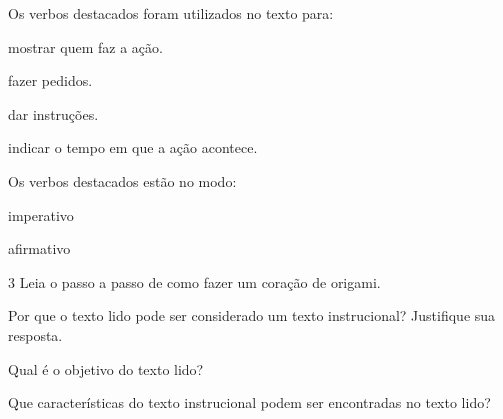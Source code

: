 \begin{escolha}
\item
  Os verbos destacados foram utilizados no texto para:

\begin{boxlist}
\boxitem[] mostrar quem faz a ação.

\boxitem[\rosa{X}] fazer pedidos.

\boxitem[] dar instruções.

\boxitem[] indicar o tempo em que a ação acontece.
\end{boxlist}

\item
  Os verbos destacados estão no modo:

\begin{boxlist}
\boxitem[\rosa{X}] imperativo

\boxitem[] afirmativo
\end{boxlist}

\end{escolha}

\num{3} Leia o passo a passo de como fazer um coração de origami.



\begin{escolha}
\item Por que o texto lido pode ser considerado um texto instrucional? Justifique sua resposta.


\item Qual é o objetivo do texto lido?


\item Que características do texto instrucional podem ser encontradas no texto lido?

\end{escolha}

